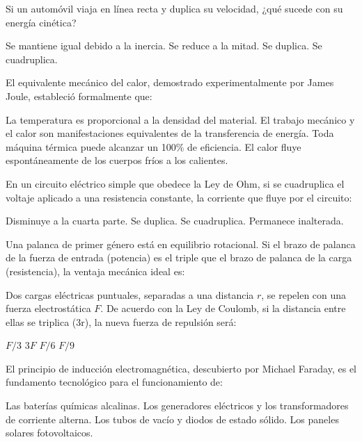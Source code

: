 \documentclass[12pt]{evaluasep}
\begin{document}
\begin{questions}
    \question Si un automóvil viaja en línea recta y duplica su velocidad, ¿qué sucede con su energía cinética?
    \begin{choices}
        \choice Se mantiene igual debido a la inercia.
        \choice Se reduce a la mitad.
        \choice Se duplica.
        \CorrectChoice Se cuadruplica.
    \end{choices}

    \question El equivalente mecánico del calor, demostrado experimentalmente por James Joule, estableció formalmente que:
    \begin{choices}
        \choice La temperatura es proporcional a la densidad del material.
        \CorrectChoice El trabajo mecánico y el calor son manifestaciones equivalentes de la transferencia de energía.
        \choice Toda máquina térmica puede alcanzar un 100\% de eficiencia.
        \choice El calor fluye espontáneamente de los cuerpos fríos a los calientes.
    \end{choices}

    \question En un circuito eléctrico simple que obedece la Ley de Ohm, si se cuadruplica el voltaje aplicado a una resistencia constante, la corriente que fluye por el circuito:
    \begin{choices}
        \choice Disminuye a la cuarta parte.
        \choice Se duplica.
        \CorrectChoice Se cuadruplica.
        \choice Permanece inalterada.
    \end{choices}

    \question Una palanca de primer género está en equilibrio rotacional. Si el brazo de palanca de la fuerza de entrada (potencia) es el triple que el brazo de palanca de la carga (resistencia), la ventaja mecánica ideal es:
    \begin{choices}
    \end{choices}

    \question Dos cargas eléctricas puntuales, separadas a una distancia $r$, se repelen con una fuerza electrostática $F$. De acuerdo con la Ley de Coulomb, si la distancia entre ellas se triplica (3r), la nueva fuerza de repulsión será:
    \begin{choices}
        \choice $F/3$
        \choice $3F$
        \choice $F/6$
        \CorrectChoice $F/9$
    \end{choices}

    \question El principio de inducción electromagnética, descubierto por Michael Faraday, es el fundamento tecnológico para el funcionamiento de:
    \begin{choices}
        \choice Las baterías químicas alcalinas.
        \CorrectChoice Los generadores eléctricos y los transformadores de corriente alterna.
        \choice Los tubos de vacío y diodos de estado sólido.
        \choice Los paneles solares fotovoltaicos.
    \end{choices}


\end{questions}
\end{document}
